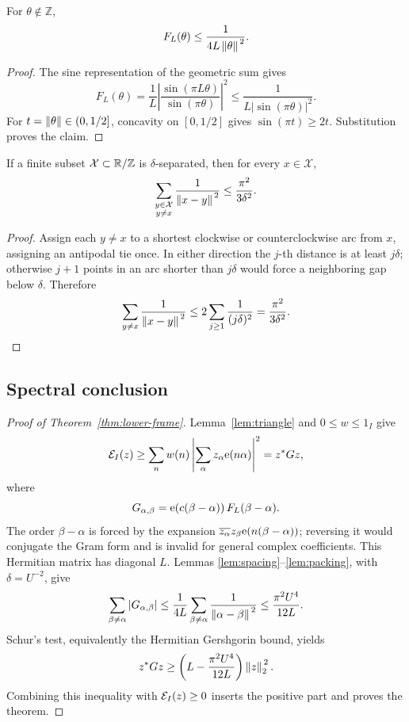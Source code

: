 \begin{lemma}
\label{lem:fejer}
For \(\theta\notin\mathbb Z\),
\[
F_L(\theta)\leq\frac1{4L\left\lVert \theta\right\rVert^{\,2}}.
\]
\end{lemma}

\begin{proof}
The sine representation of the geometric sum gives
\[
F_L(\theta)
=\frac1L\left|\frac{\sin(\pi L\theta)}{\sin(\pi\theta)}\right|^2
\leq\frac1{L|\sin(\pi\theta)|^2}.
\]
For \(t=\left\lVert \theta\right\rVert\in(0,1/2]\), concavity on \([0,1/2]\) gives
\(\sin(\pi t)\geq2t\).  Substitution proves the claim.
\end{proof}

\begin{lemma}
\label{lem:packing}
If a finite subset \(\mathcal X\subset\mathbb{R}/\mathbb{Z}\) is
\(\delta\)-separated, then for every \(x\in\mathcal X\),
\[
\sum_{\substack{y\in\mathcal X\\y\ne x}}
\frac1{\left\lVert x-y\right\rVert^{\,2}}\leq\frac{\pi^2}{3\delta^2}.
\]
\end{lemma}

\begin{proof}
Assign each \(y\ne x\) to a shortest clockwise or counterclockwise arc from
\(x\), assigning an antipodal tie once.  In either direction the \(j\)-th
distance is at least \(j\delta\); otherwise \(j+1\) points in an arc shorter
than \(j\delta\) would force a neighboring gap below \(\delta\).  Therefore
\[
\sum_{y\ne x}\frac1{\left\lVert x-y\right\rVert^{\,2}}
\leq2\sum_{j\geq1}\frac1{(j\delta)^2}
=\frac{\pi^2}{3\delta^2}.
\]
\end{proof}

\subsection{Spectral conclusion}

\begin{proof}[Proof of Theorem~\ref{thm:lower-frame}]
Lemma~\ref{lem:triangle} and \(0\leq w\leq1_I\) give
\[
\mathcal{E}_I(z)\geq
\sum_nw(n)\left|\sum_\alpha z_\alpha\mathrm{e}(n\alpha)\right|^2
=z^\ast Gz,
\]
where
\[
G_{\alpha,\beta}
=\mathrm{e}\!\left(c(\beta-\alpha)\right)F_L(\beta-\alpha).
\]
The order \(\beta-\alpha\) is forced by the expansion
\(\overline{z_\alpha}z_\beta\mathrm{e}(n(\beta-\alpha))\); reversing it would
conjugate the Gram form and is invalid for general complex coefficients.
This Hermitian matrix has diagonal \(L\).  Lemmas
\ref{lem:spacing}--\ref{lem:packing}, with \(\delta=U^{-2}\), give
\[
\sum_{\beta\ne\alpha}|G_{\alpha,\beta}|
\leq\frac1{4L}
\sum_{\beta\ne\alpha}\frac1{\left\lVert \alpha-\beta\right\rVert^{\,2}}
\leq\frac{\pi^2U^4}{12L}.
\]
Schur's test, equivalently the Hermitian Gershgorin bound, yields
\[
z^\ast Gz\geq
\left(L-\frac{\pi^2U^4}{12L}\right)\left\lVert z\right\rVert_{2}^{\,2}.
\]
Combining this inequality with \(\mathcal{E}_I(z)\geq0\) inserts the positive
part and proves the theorem.
\end{proof}

